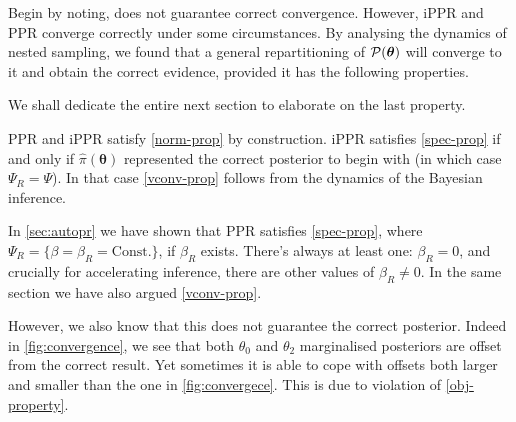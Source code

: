 \documentclass[usenatbib]{mnras}
\begin{document}
Begin by noting,  does not guarantee correct
convergence. However, iPPR and PPR converge correctly under some
circumstances. By analysing the dynamics of nested sampling, we found
that a general repartitioning of \( {\cal P}(\bm{\theta})\) will
converge to it and obtain the correct evidence, provided it has the
following properties.
We shall dedicate the entire next section to elaborate on the last
property.

PPR and iPPR satisfy \cref{norm-prop} by construction. iPPR satisfies
\cref{spec-prop} if and only if \( \hat{\pi} (\bm{\theta})\)
represented the correct posterior to begin with (in which case
$\Psi_{R} = \Psi$). In that case \cref{vconv-prop} follows from the
dynamics of the Bayesian inference.

In \cref{sec:autopr} we have shown that PPR satisfies
\cref{spec-prop}, where
$\Psi_{R} = \{ \beta = \beta_{R} = \text{Const.}\}$, if $\beta_{R}$
exists. There's always at least one: $\beta_{R}=0$, and crucially for
accelerating inference, there are other values of $\beta_{R}\ne 0$. In
the same section we have also argued \cref{vconv-prop}.

However, we also know that this does not guarantee the correct
posterior. Indeed in \cref{fig:convergence}, we see that both
$\theta_{0}$ and $\theta_{2}$ marginalised posteriors are offset from
the correct result. Yet sometimes it is able to cope with offsets both
larger and smaller than the one in \cref{fig:convergece}. This is due
to violation of \cref{obj-property}.
\end{document}
